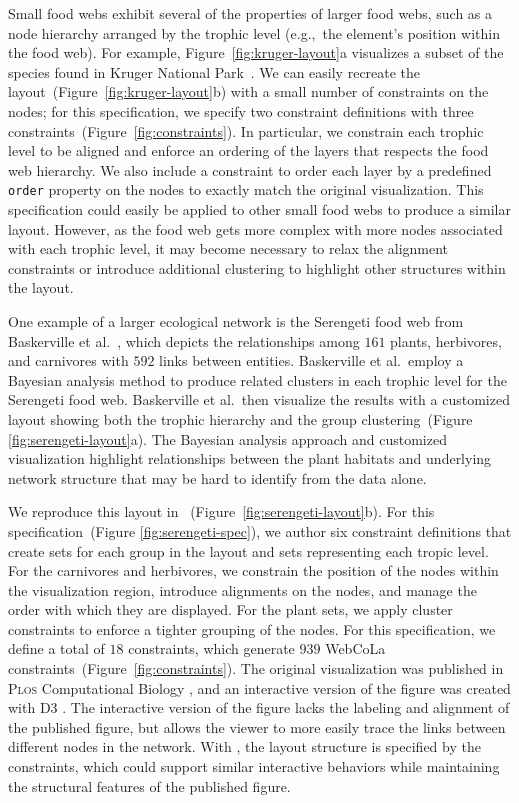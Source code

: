 Small food webs exhibit several of the properties of larger food webs, such
as a node hierarchy arranged by the trophic level (e.g.,~the element's 
position within the food web).
For example, Figure~\ref{fig:kruger-layout}a visualizes a subset of the
species found in Kruger National Park~\cite{kruger2017}. We can easily 
recreate the layout~(Figure~\ref{fig:kruger-layout}b) with a small 
number of constraints on the nodes; for this specification, we specify 
two constraint definitions with three constraints~(Figure~\ref{fig:constraints}).
In particular, we constrain each trophic level to be aligned and enforce an
ordering of the layers that respects the food web hierarchy. We also
include a constraint to order each layer by a predefined \texttt{order} property
on the nodes to exactly match the original visualization. This \projectname specification 
could easily be applied to other small food webs to produce a similar layout.
However, as the food web gets more complex with more nodes associated with
each trophic level, it may become necessary to relax the alignment
constraints or introduce additional clustering to highlight other
structures within the layout.

One example of a larger ecological network is the Serengeti food web from
Baskerville et al.~\cite{baskerville2011spatial}, which depicts the
relationships among $161$ plants, herbivores, and carnivores with $592$ links
between entities. Baskerville et al.\ employ a Bayesian analysis method to
produce related clusters in each trophic level for the Serengeti food web.
Baskerville et al.\ then visualize the results with a
customized layout showing both the trophic hierarchy and
the group clustering~(Figure \ref{fig:serengeti-layout}a). The Bayesian
analysis approach and customized visualization highlight relationships between
the plant habitats and underlying network structure that may be hard to identify
from the data alone.

We reproduce this layout in \projectname~(Figure~\ref{fig:serengeti-layout}b).
For this specification~(Figure \ref{fig:serengeti-spec}), we author six constraint 
definitions that create sets for each group in the layout and sets 
representing each tropic level. For the carnivores and herbivores,
we constrain the position of the nodes within the visualization region,
introduce alignments on the nodes, and manage the order with which they
are displayed. For the plant sets, we apply cluster constraints
to enforce a tighter grouping of the nodes. For this specification,
we define a total of $18$ \projectname constraints, which generate $939$
WebCoLa constraints~(Figure~\ref{fig:constraints}).
The original visualization was published in \textsc{Plos} Computational
Biology \cite{baskerville2011spatial}, and an interactive version of the
figure was created with D3 \cite{baskerville2011interactive}. The
interactive version of the figure lacks the labeling and alignment of the
published figure, but allows the viewer to more easily trace the links
between different nodes in the network. With \projectname, the layout
structure is specified by the constraints, which could support similar
interactive behaviors while maintaining the structural features of the
published figure.

